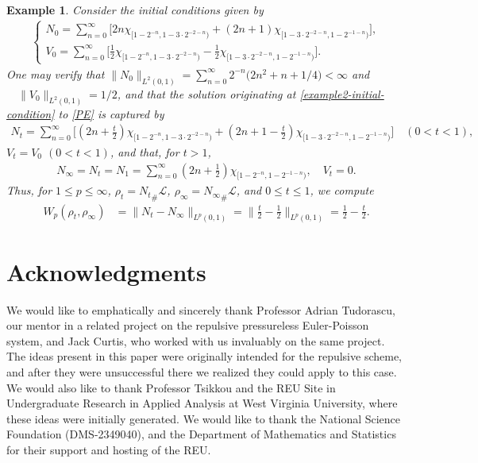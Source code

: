 \documentclass[11pt]{article}
\newtheorem{example}[thm]{Example}
\numberwithin{equation}{section}
\begin{document}
    \begin{example}
        Consider the initial conditions given by 
        \begin{align}\label{example2-initial-condition}
            \begin{cases}
                N_0=\displaystyle\sum_{n=0}^\infty\big[2n\chi_{[1-2^{-n},1-3\cdot2^{-2-n})}+(2n+1)\chi_{[1-3\cdot2^{-2-n},1-2^{-1-n})}\big],
                \\
                V_0=\displaystyle\sum_{n=0}^\infty\big[\frac{1}{2}\chi_{[1-2^{-n},1-3\cdot2^{-2-n})}-\frac{1}{2}\chi_{[1-3\cdot2^{-2-n},1-2^{-1-n})}\big]. 
            \end{cases}
        \end{align}
        One may verify that $\|N_0\|_{L^2(0,1)}=\sum_{n=0}^\infty 2^{-n}\big(2n^2+n+1/4\big)<\infty$ and $\quad \|V_0\|_{L^2(0,1)}=1/2$, and that the solution originating at \eqref{example2-initial-condition} to \eqref{PE} is captured by 
        \begin{align*}
                N_t=\sum_{n=0}^\infty\big[(2n+\frac{t}{2})\chi_{[1-2^{-n},1-3\cdot2^{-2-n})}+(2n+1-\frac{t}{2})\chi_{[1-3\cdot2^{-2-n},1-2^{-1-n})}\big] \quad (0<t<1),
        \end{align*}
        $V_t=V_0$ $(0<t<1)$, and that, for $t>1$, 
        \begin{align*}
            N_\infty=N_t=N_1=\sum_{n=0}^\infty(2n+\frac{1}{2})\chi_{[1-2^{-n},1-2^{-1-n})}, \quad V_t=0.
        \end{align*}
        Thus, for $1\leq p\leq\infty$, $\rho_t={N_t}_\#\mathcal{L}$, $\rho_\infty={N_\infty}_\#\mathcal{L}$, and $0\leq t\leq1$, we compute 
        \begin{align*}
            W_p(\rho_t,\rho_\infty)&=\|N_t-N_\infty\|_{L^p(0,1)}
            =\|\frac{t}{2}-\frac{1}{2}\|_{L^p(0,1)}=\frac{1}{2}-\frac{t}{2}. 
        \end{align*}
    \end{example}

\section{Acknowledgments}
    We would like to emphatically and sincerely thank Professor Adrian Tudorascu, our mentor in a related project on the repulsive pressureless Euler-Poisson system, and Jack Curtis, who worked with us invaluably on the same project. The ideas present in this paper were originally intended for the repulsive scheme, and after they were unsuccessful there we realized they could apply to this case. We would also like to thank Professor Tsikkou and the REU Site in Undergraduate Research in Applied Analysis at West Virginia University, where these ideas were initially generated. We would like to thank the National Science Foundation (DMS-2349040), and the Department of Mathematics and Statistics for their support and hosting of the REU. 
\end{document}
